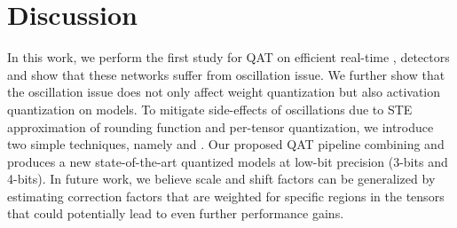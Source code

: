 \vspace{2ex}
\section{Discussion}
\vspace{0.5ex}

In this work, we perform the first study for \acrshort{QAT} on efficient real-time \yoloa{}, \yolob{} detectors and show that these networks suffer from oscillation issue. We further show that the oscillation issue does not only affect weight quantization but also activation quantization on \yolo{} models. To mitigate side-effects of oscillations due to \acrshort{STE} approximation of rounding function and per-tensor quantization, we introduce two simple techniques, namely \exma{} and \qc{}. Our proposed \acrshort{QAT} pipeline combining \exma{} and \qc{} produces a new state-of-the-art quantized \yolo{} models at low-bit precision (3-bits and 4-bits). In future work, we believe \qc{} scale and shift factors can be generalized by estimating correction factors that are weighted for specific regions in the tensors that could potentially lead to even further performance gains. 
